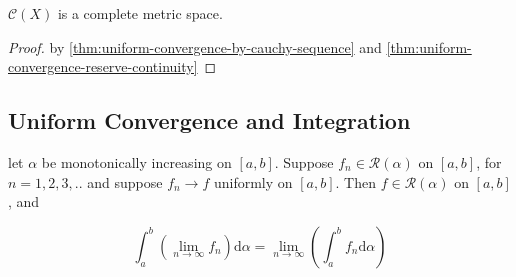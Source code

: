 \begin{thm}
    $\mathscr{C}(X)$ is a complete metric space.
\end{thm}

\begin{proof}
    by \autoref{thm:uniform-convergence-by-cauchy-sequence} and \autoref{thm:uniform-convergence-reserve-continuity}
\end{proof}

\subsection{Uniform Convergence and Integration}

\begin{thm}
    let $\alpha$ be monotonically increasing on $[a,b]$. Suppose $f_n \in \mathscr{R}(\alpha)$ on $[a,b]$,
    for $n =1,2,3,..$ and suppose $f_n \to f$ uniformly on $[a,b]$.
    Then $f \in \mathscr{R}(\alpha)$ on $[a,b]$, and

    \[
        \int_a^b \left( \lim_{n \to \infty} f_n\right) \mathrm{d} \alpha =  \lim_{n \to \infty} \left(\int_a^b f_n \mathrm{d} \alpha \right)
    \]

\end{thm}

